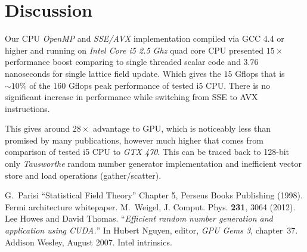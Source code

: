\documentclass[a4paper]{llncs}
\begin{document}
\section{Discussion}

Our CPU \emph{OpenMP} and \emph{SSE/AVX} implementation compiled via
GCC 4.4 or higher and running on \emph{Intel Core i5 2.5 Ghz} quad
core CPU presented $15\times$ performance boost comparing to single
threaded scalar code and $3.76$ nanoseconds for single lattice field
update.  Which gives the $15$ Gflops that is $\sim10\%$ of the  $160$
Gflops peak performance of tested i5 CPU. There is no significant
increase in performance while switching from SSE to AVX instructions.

This gives around $28\times$ advantage to GPU, which is noticeably
less than promised by many publications, however much higher that
comes from comparison of  tested i5
CPU to \emph{GTX 470}. This can be
traced back to 128-bit only \emph{Tausworthe} random number generator
implementation and inefficient vector store and load operations
(gather/scatter).

\begin{thebibliography}{9}
 G.~Parisi ``Statistical Field Theory'' Chapter 5, Perseus Books Publishing (1998).
 Fermi architecture whitepaper. 
 M.~Weigel, J. Comput. Phys. \textbf{231}, 3064 (2012).
Lee Howes and David Thomas.
``{\em Efficient random number generation and application using {CUDA}.}''
In Hubert Nguyen, editor, {\em GPU Gems 3}, chapter~37. Addison
  Wesley, August 2007.
 Intel intrinsics. 
\end{thebibliography}
\end{document}
